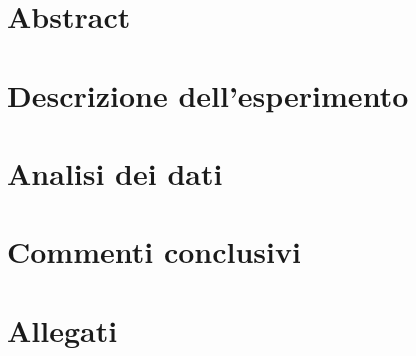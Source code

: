 \documentclass[a4paper,11pt]{article}
\begin{document}
	\tableofcontents
	
	\vspace{2cm}
	\section{Abstract}
	\newpage
	
	
	
	\section{Descrizione dell'esperimento}
	\section{Analisi dei dati}

			
	\section{Commenti conclusivi}
	
	
	\section{Allegati}
\end{document}
